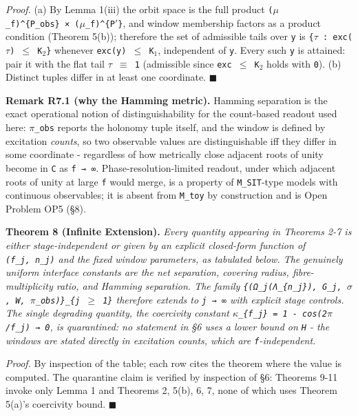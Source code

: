 \documentclass[
  american,
  11pt,
  letterpaper,
]{article}
\newcounter{none} %
\begin{document}
\emph{Proof.} (a) By Lemma 1(iii) the orbit space is the full product \texttt{(\ensuremath{\mu}\_f)\^{}\{P\_obs\}\ ×\ (\ensuremath{\mu}\_f)\^{}\{P\ensuremath{'}\}}, and window membership factors as a product condition (Theorem 5(b)); therefore the set of admissible tails over \texttt{y} is \texttt{\{\ensuremath{\tau}\ :\ exc(\ensuremath{\tau})\ \ensuremath{\leq}\ K\ensuremath{{}_{2}}\}} whenever \texttt{exc(y)\ \ensuremath{\leq}\ K\ensuremath{{}_{1}}}, independent of \texttt{y}. Every such \texttt{y} is attained: pair it with the flat tail \texttt{\ensuremath{\tau}\ \ensuremath{\equiv}\ 1} (admissible since \texttt{exc\ \ensuremath{\leq}\ K\ensuremath{{}_{2}}} holds with \texttt{0}). (b) Distinct tuples differ in at least one coordinate. \ensuremath{\blacksquare}

\textbf{Remark R7.1 (why the Hamming metric).} Hamming separation is the exact operational notion of distinguishability for the count-based readout used here: \texttt{\ensuremath{\pi}\_obs} reports the holonomy tuple itself, and the window is defined by excitation \emph{counts}, so two observable values are distinguishable iff they differ in some coordinate - regardless of how metrically close adjacent roots of unity become in \texttt{C} as \texttt{f\ →\ ∞}. Phase-resolution-limited readout, under which adjacent roots of unity at large \texttt{f} would merge, is a property of \texttt{M\_SIT}-type models with continuous observables; it is absent from \texttt{M\_toy} by construction and is Open Problem OP5 (§8).

\textbf{Theorem 8 (Infinite Extension).} \emph{Every quantity appearing in Theorems 2-7 is either stage-independent or given by an explicit closed-form function of \texttt{(f\_j,\ n\_j)} and the fixed window parameters, as tabulated below. The genuinely uniform interface constants are the net separation, covering radius, fibre-multiplicity ratio, and Hamming separation. The family \texttt{\{(Ω\_j(Λ\_\{n\_j\}),\ G\_j,\ \ensuremath{\sigma},\ W,\ \ensuremath{\pi}\_obs)\}\_\{j\ \ensuremath{\geq}\ 1\}} therefore extends to \texttt{j\ →\ ∞} with explicit stage controls. The single degrading quantity, the coercivity constant \texttt{\ensuremath{\kappa}\_\{f\_j\}\ =\ 1\ -\ cos(2\ensuremath{\pi}/f\_j)\ →\ 0}, is quarantined: no statement in §6 uses a lower bound on \texttt{H} - the windows are stated directly in excitation counts, which are \texttt{f}-independent.}

\emph{Proof.} By inspection of the table; each row cites the theorem where the value is computed. The quarantine claim is verified by inspection of §6: Theorems 9-11 invoke only Lemma 1 and Theorems 2, 5(b), 6, 7, none of which uses Theorem 5(a)'s coercivity bound. \ensuremath{\blacksquare}
\end{document}
